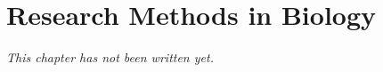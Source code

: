 \chapter{Research Methods in Biology}\label{ch:b3:methods}


\emph{This chapter has not been written yet.}
